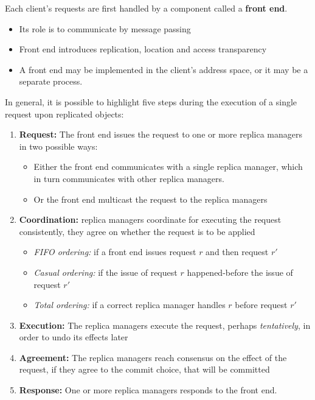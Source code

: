 Each client’s requests are first handled by a component called a \textbf{front end}.
\begin{itemize}
    \item Its role is to communicate by message passing
    \item Front end introduces replication, location and access transparency
    \item A front end may be implemented in the client’s address space, or it may be a separate process.
\end{itemize}

In general, it is possible to highlight five steps during the execution of a single request upon replicated objects:
\begin{enumerate}
    \item \textbf{Request:} The front end issues the request to one or more replica managers in two possible ways:
    \begin{itemize}
        \item Either the front end communicates with a single replica manager, which in turn communicates with other replica managers.
        \item Or the front end multicast the request to the replica managers
    \end{itemize}
    \item \textbf{Coordination:} replica managers coordinate for executing the request consistently, they agree on whether the request is to be applied
    \begin{itemize}
        \item \textit{FIFO ordering:} if a front end issues request \(r\) and then request \(r'\)
        \item \textit{Casual ordering:} if the issue of request \(r\) happened-before the issue of request \(r'\)
        \item \textit{Total ordering:} if a correct replica manager handles \(r\) before request \(r'\)
    \end{itemize}
    \item \textbf{Execution:} The replica managers execute the request, perhaps \textit{tentatively}, in order to undo its effects later
    \item \textbf{Agreement:} The replica managers reach consensus on the effect of the request, if they agree to the commit choice, that will be committed
    \item \textbf{Response:} One or more replica managers responds to the front end.
\end{enumerate}